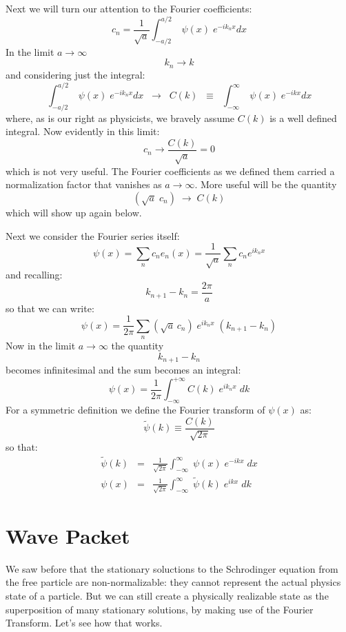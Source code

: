 \documentclass[12pt]{book}
\begin{document}
Next we will turn our attention to the Fourier coefficients:
$$c_n = \frac{1}{\sqrt{a}} \int_{-a/2}^{a/2} \; \psi(x) \; e^{-ik_nx} dx$$
In the limit $a \to \infty$
$$k_n \to k$$
and considering just the integral:
$$\int_{-a/2}^{a/2} \; \psi(x) \; e^{-ik_nx} dx \;\; \to \;\; C(k) \;\; \equiv \;\; \int_{-\infty}^{\infty} \; \psi(x) \; e^{-ikx} dx$$
where, as is our right as physicists, we bravely assume $C(k)$ is a well defined integral.
Now evidently in this limit:
$$c_n \to \frac{C(k)}{\sqrt{a}} = 0$$
which is not very useful.  The Fourier coefficients as we defined them carried a normalization factor that vanishes as $a \to \infty$.  More useful will be the quantity
$$ \left(\sqrt{a} \; c_n \right) \; \to \; C(k) $$
which will show up again below.

Next we consider the Fourier series itself:
$$\psi(x) = \sum_n c_n e_n(x) = \frac{1}{\sqrt{a}} \sum_n c_n e^{i k_n x}$$
and recalling:
$$k_{n+1}-k_n = \frac{2\pi}{a}$$
so that we can write:
$$\psi(x) = \frac{1}{2\pi} \sum_n (\sqrt{a} \, c_n) \; e^{i k_n x} \; (k_{n+1}-k_{n})$$
Now in the limit $a \to \infty$ the quantity $$k_{n+1}-k_{n}$$ becomes infinitesimal 
and the sum becomes an integral:
$$\psi(x) = \frac{1}{2\pi} \int_{-\infty}^{+\infty} C(k) \; e^{i k_n x} \; dk$$
For a symmetric definition we define the Fourier transform of $\psi(x)$ as:
\begin{equation*}
\widetilde{\psi}(k) \equiv \frac{C(k)}{\sqrt{2\pi}} 
\end{equation*}
so that:
\begin{eqnarray}
\widetilde{\psi}(k) &=& \frac{1}{\sqrt{2\pi}} 
\int_{-\infty}^{\infty} \; \psi(x) \; e^{-ikx} \; dx \\[8pt]
\psi(x) &=& \frac{1}{\sqrt{2\pi}} 
\int_{-\infty}^{\infty} \; \widetilde{\psi}(k) \; e^{ikx} \; dk
\end{eqnarray}


\section{Wave Packet}

We saw before that the stationary soluctions to the Schrodinger
equation from the free particle are non-normalizable: they cannot
represent the actual physics state of a particle.  But we can still
create a physically realizable state as the superposition of many
stationary solutions, by making use of the Fourier Transform.  Let's
see how that works.
\end{document}
